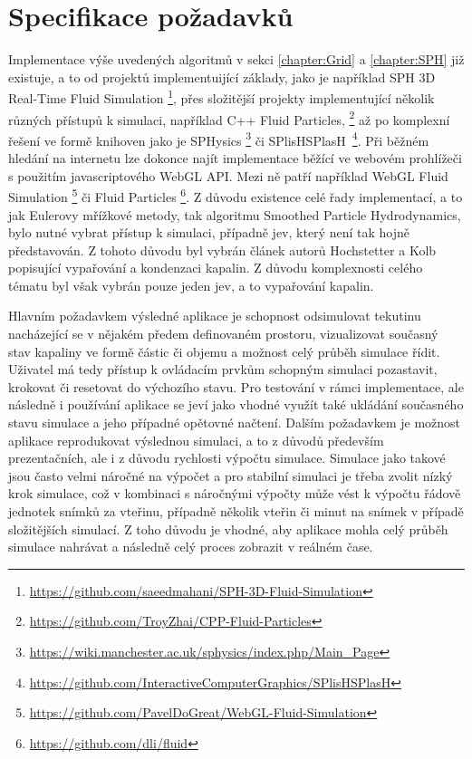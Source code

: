 \section{Specifikace požadavků}
\label{chapter:spec}
Implementace výše uvedených algoritmů v sekci \ref{chapter:Grid} a \ref{chapter:SPH} již existuje, a to od projektů implementuijící základy, jako je například SPH 3D Real-Time Fluid Simulation \footnote{\url{https://github.com/saeedmahani/SPH-3D-Fluid-Simulation}}, přes složitější projekty implementující několik různých přístupů k simulaci, například C++ Fluid Particles, \footnote{\url{https://github.com/TroyZhai/CPP-Fluid-Particles}} až po komplexní řešení ve formě knihoven jako je SPHysics \footnote{\url{https://wiki.manchester.ac.uk/sphysics/index.php/Main_Page}} či SPlisHSPlasH~\footnote{\url{https://github.com/InteractiveComputerGraphics/SPlisHSPlasH}}. Při běžném hledání na internetu lze dokonce najít implementace běžící ve webovém prohlížeči s použitím javascriptového WebGL API. Mezi ně patří například WebGL Fluid Simulation \footnote{\url{https://github.com/PavelDoGreat/WebGL-Fluid-Simulation}} či Fluid Particles \footnote{\url{https://github.com/dli/fluid}}. Z důvodu existence celé řady implementací, a to jak Eulerovy mřížkové metody, tak algoritmu Smoothed Particle Hydrodynamics, bylo nutné vybrat přístup k simulaci, případně jev, který není tak hojně představován. Z tohoto důvodu byl vybrán článek autorů Hochstetter a Kolb popisující vypařování a kondenzaci kapalin. Z důvodu komplexnosti celého tématu byl však vybrán pouze jeden jev, a to vypařování kapalin.

Hlavním požadavkem výsledné aplikace je schopnost odsimulovat tekutinu nacházející se v nějakém předem definovaném prostoru, vizualizovat současný stav kapaliny ve formě částic či objemu a možnost celý průběh simulace řídit. Uživatel má tedy přístup k ovládacím prvkům schopným simulaci pozastavit, krokovat či resetovat do výchozího stavu. Pro testování v rámci implementace, ale následně i používání aplikace se jeví jako vhodné využít také ukládání současného stavu simulace a jeho případné opětovné načtení. Dalším požadavkem je možnost aplikace reprodukovat výslednou simulaci, a to z důvodů především prezentačních, ale i z důvodu rychlosti výpočtu simulace. Simulace jako takové jsou často velmi náročné na výpočet a pro stabilní simulaci je třeba zvolit nízký krok simulace, což v kombinaci s náročnými výpočty může vést k výpočtu řádově jednotek snímků za vteřinu, případně několik vteřin či minut na snímek v případě složitějších simulací. Z toho důvodu je vhodné, aby aplikace mohla celý průběh simulace nahrávat a následně celý proces zobrazit v reálném čase. 

